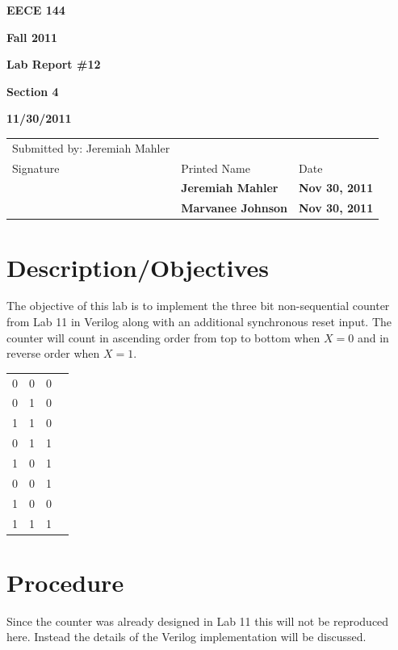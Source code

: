 \documentclass[12pt]{article}
\begin{document}
\centerline{\bf EECE 144}
\centerline{\bf Fall 2011}
\centerline{\bf}
\centerline{\bf Lab Report \#12}
\centerline{\bf Section 4}
\centerline{\bf 11/30/2011} %
\begin{center}
\begin{tabularx}{\textwidth}[b]{X l l}
Submitted by: Jeremiah Mahler & & \\
Signature & Printed Name & Date \\
\hline
\multicolumn{1}{|X|}{} & \multicolumn{1}{|l|}{\bigstrut \bf Jeremiah Mahler} & \multicolumn{1}{|l|}{\bf Nov 30, 2011} \\
\hline
\multicolumn{1}{|X|}{} & \multicolumn{1}{|l|}{\bigstrut \bf Marvanee Johnson} & \multicolumn{1}{|l|}{\bf Nov 30, 2011} \\
\hline
\end{tabularx}
\end{center}

\section{Description/Objectives}

The objective of this lab is to implement the three bit non-sequential
counter from Lab 11\cite{mahler144lab11} in Verilog along with
an additional synchronous reset input.
The counter will count in ascending order from top to
bottom when $X = 0$ and in reverse order when $X = 1$.

\begin{center}
\begin{tabular}[t]{cccc}
0 & 0 & 0 \\
0 & 1 & 0 \\
1 & 1 & 0 \\
0 & 1 & 1 \\
1 & 0 & 1 \\
0 & 0 & 1 \\
1 & 0 & 0 \\
1 & 1 & 1 \\
\end{tabular}
\end{center}


\section{Procedure}
\label{sec:procedure}

Since the counter was already designed in Lab 11\cite{mahler144lab11} 
this will not be reproduced here.
Instead the details of the Verilog implementation will be discussed.
\end{document}
